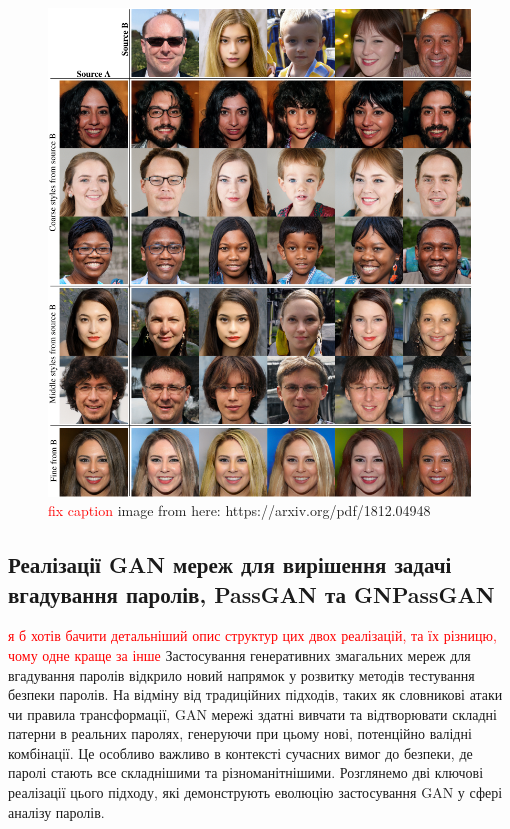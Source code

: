 \begin{figure}[ht]
        \centering
        \includegraphics[scale=0.4]{Images/GAN_generated_image.png}
        \caption{\textcolor{red}{fix caption} image from here: https://arxiv.org/pdf/1812.04948}
        \label{gan_generated_image}
\end{figure}
\newpage

\subsection{Реалізації GAN мереж для вирішення задачі вгадування паролів, PassGAN та GNPassGAN}
\textcolor{red}{я б хотів бачити детальніший опис структур цих двох реалізацій, та їх різницю, чому одне краще за інше}
Застосування генеративних змагальних мереж для вгадування паролів відкрило новий напрямок у розвитку методів тестування безпеки паролів. На відміну від традиційних підходів, таких як словникові атаки чи правила трансформації, GAN мережі здатні вивчати та відтворювати складні патерни в реальних паролях, генеруючи при цьому нові, потенційно валідні комбінації. Це особливо важливо в контексті сучасних вимог до безпеки, де паролі стають все складнішими та різноманітнішими. Розглянемо дві ключові реалізації цього підходу, які демонструють еволюцію застосування GAN у сфері аналізу паролів.

